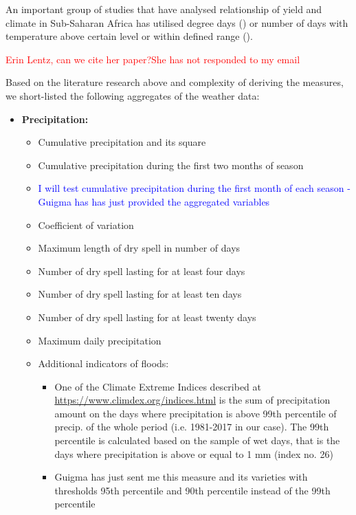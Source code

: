 \documentclass[a4paper,12pt]{article}
\begin{document}
An important group of studies that have analysed relationship of yield and climate in Sub-Saharan Africa has utilised degree days (\citealt{SchulzeEtA1993,TingemEtAl2008,WalkerSchulze2008,TingemEtAl2009}) or number of days with temperature above certain level or within defined range (\citealt{Giannakopoulos2009,LauxEtAl}).


\textcolor{red}{Erin Lentz, can we cite her paper?She has not responded to my email}


Based on the literature research above and complexity of deriving the measures, we short-listed the following aggregates of the weather data:



\begin{itemize}

\item \textbf{\textbf{Precipitation}:}

\begin{itemize}
\item Cumulative precipitation and its square
\item Cumulative precipitation during the first two months of season
\item \textcolor{blue}{I will test cumulative precipitation  during the first month of each season - Guigma has has just provided the aggregated variables}


\item Coefficient of variation
\item Maximum length of dry spell in number of days
\item Number of dry spell lasting for at least four days
\item Number of dry spell lasting for at least ten days
\item Number of dry spell lasting for at least twenty days
\item Maximum daily precipitation
\color{blue}
\item Additional indicators of floods:

\begin{itemize}
\item One of the Climate Extreme Indices described at \url{https://www.climdex.org/indices.html} is the sum of precipitation amount on the days where precipitation is above 99th percentile of precip. of the whole period (i.e. 1981-2017 in our case). The 99th percentile is calculated based on the sample of wet days, that is the days where precipitation is above or equal to 1 mm (index no. 26)
\item Guigma has just sent me this measure and its varieties with thresholds 95th percentile and 90th percentile instead of the 99th percentile
\end{itemize}
\color{black}


\end{itemize}
\end{itemize}
\end{document}

